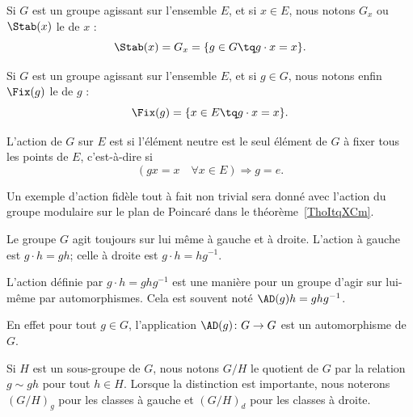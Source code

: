 \begin{definition}[Stabilisateur]       \label{DEFooMDYGooLrOERP}
	Si \( G\) est un groupe agissant sur l'ensemble \( E\), et si \( x\in E\), nous notons \( G_x\) ou \( \Stab(x)\) le  de \( x\) :
	\begin{equation}
		\Stab(x)=G_x=\{ g\in G\tq g\cdot x=x \}.
	\end{equation}
\end{definition}

\begin{definition}[Fixateur]
	Si \( G\) est un groupe agissant sur l'ensemble \( E\), et si \( g\in G\), nous notons enfin \( \Fix(g)\) le  de \( g\) :
	\begin{equation}
		\Fix(g)=\{ x\in E\tq g\cdot x=x \}.
	\end{equation}
\end{definition}

\begin{definition}  \label{DefuyYJRh}
	L'action de \( G\) sur \( E\) est  si l'élément neutre est le seul élément de \( G\) à fixer tous les points de \( E\), c'est-à-dire si
	\begin{equation}
		(gx=x\quad \forall x\in E)\Rightarrow g=e.
	\end{equation}
\end{definition}

Un exemple d'action fidèle tout à fait non trivial sera donné avec l'action du groupe modulaire sur le plan de Poincaré dans le théorème~\ref{ThoItqXCm}.

Le groupe \( G\) agit toujours sur lui même à gauche et à droite. L'action à gauche est \( g\cdot h=gh\); celle à droite est \( g\cdot h=hg^{-1}\).

\begin{definition}      \label{DEFooCORTooEeOLPT}
	L'action  définie par \( g\cdot h=ghg^{-1}\) est une manière pour un groupe d'agir sur lui-même par automorphismes. Cela est souvent noté \( \AD(g)h=ghg^{-1}\).
\end{definition}
En effet pour tout \( g\in G\), l'application \( \AD(g)\colon G\to G\) est un automorphisme de \( G\).

Si \( H\) est un sous-groupe de  \( G\), nous notons \( G/H\) le quotient de \( G\) par la relation \( g\sim gh\) pour tout \( h\in H\). Lorsque la distinction est importante, nous noterons \( (G/H)_g\) pour les classes à gauche et \( (G/H)_d\) pour les classes à droite.

